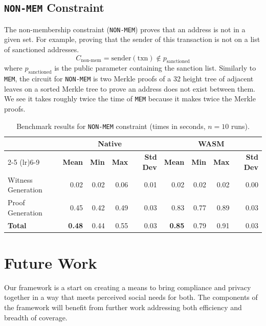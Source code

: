\documentclass[9pt]{extreport}
\begin{document}
\section{\texttt{NON-MEM} Constraint}
\label{sec:non-mem-benchmark}
The non-membership constraint (\texttt{NON-MEM}) proves that an address is not in a given set. For example, proving that the sender of this transaction is not on a list of sanctioned addresses.
$$C_{\text{non-mem}} = \text{sender}(\text{txn}) \notin p_{\text{sanctioned}}$$
where $p_{\text{sanctioned}}$ is the public parameter containing the sanction list.
Similarly to \texttt{MEM}, the circuit for \texttt{NON-MEM} is two Merkle proofs of a 32 height tree of adjacent leaves on a sorted Merkle tree to prove an address does not exist between them.  We see it takes roughly twice the time of \texttt{MEM} because it makes twice the Merkle proofs.

\begin{table}[h]
\caption[NON-MEM constraint benchmarks]{Benchmark results for \texttt{NON-MEM} constraint (times in seconds, $n=10$ runs).}
\centering
\begin{tabular}{l rrrr rrrr}
 & \multicolumn{4}{c}{\textbf{Native}} & \multicolumn{4}{c}{\textbf{WASM}} \\
\cmidrule(lr){2-5} \cmidrule(lr){6-9}
 & \textbf{Mean} & \textbf{Min} & \textbf{Max} & \textbf{Std Dev}
 & \textbf{Mean} & \textbf{Min} & \textbf{Max} & \textbf{Std Dev} \\
\midrule
Witness Generation & 0.02 & 0.02 & 0.06 & 0.01 & 0.02 & 0.02 & 0.02 & 0.00 \\
Proof Generation   & 0.45 & 0.42 & 0.49 & 0.03 & 0.83 & 0.77 & 0.89 & 0.03 \\
\midrule
\textbf{Total}     & \textbf{0.48} & 0.44 & 0.55 & 0.03 & \textbf{0.85} & 0.79 & 0.91 & 0.03 \\
\end{tabular}
\label{tab:nonmem-benchmarks}
\end{table}

\chapter{Future Work}
Our framework is a start on creating a means to bring
compliance and privacy together in a way that meets perceived social needs for both.  The components of the framework will benefit from further work addressing both efficiency and breadth of coverage.
\end{document}
